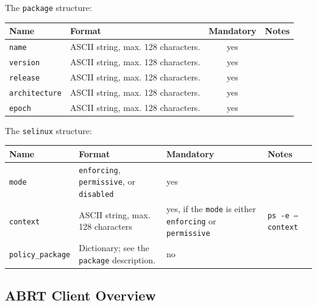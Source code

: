 \documentclass{article}
\begin{document}
The \texttt{package} structure:

\begin{center}
\begin{tabular}{l|p{5cm}|c|p{5cm}}
\hline
Name & Format & Mandatory & Notes \\ \hline
\texttt{name} & ASCII string, max. 128 characters. & yes & \\
\texttt{version} & ASCII string, max. 128 characters. & yes & \\
\texttt{release} & ASCII string, max. 128 characters. & yes & \\
\texttt{architecture} & ASCII string, max. 128 characters. & yes & \\
\texttt{epoch} & ASCII string, max. 128 characters. & yes & \\
\hline
\end{tabular}
\end{center}

The \texttt{selinux} structure:
\begin{center}
\begin{tabular}{l|p{5cm}|p{3cm}|p{5cm}}
\hline
Name & Format & Mandatory & Notes \\ \hline
\texttt{mode} & \texttt{enforcing}, \texttt{permissive}, or \texttt{disabled} & yes & \\
\texttt{context} & ASCII string, max. 128 characters & yes, if the \texttt{mode} is either \texttt{enforcing} or \texttt{permissive} & \texttt{ps -e --context} \\
\texttt{policy\_package} & Dictionary; see the \texttt{package} description. & no & \\
\hline
\end{tabular}
\end{center}

\subsection{ABRT Client Overview}
\end{document}
